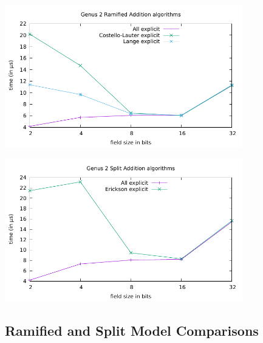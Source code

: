 \centerline{\includegraphics[width=0.775\textwidth]{genus2/g2_G1_RAM_ADD.pdf}}
\centerline{\includegraphics[width=0.775\textwidth]{genus2/g2_G1_SPL_ADD.pdf}}

\subsection{Ramified and Split Model Comparisons}

